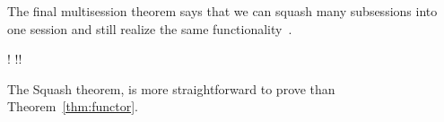 The final multisession theorem says that we can squash many subsessions into one session and still realize the same functionality~\cite{juc}.
\begin{theorem}\label{thm:squash}
	\begin{mathpar}
		{
			!\F {} !!\F
		}
	\end{mathpar}
\end{theorem}
The Squash theorem, is more straightforward to prove than Theorem~\ref{thm:functor}.

%



